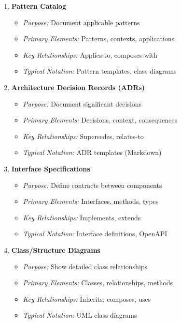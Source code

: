 \documentclass[11pt,letterpaper]{article}
\begin{document}
\begin{enumerate}[label=\textbf{MT\arabic*:}, leftmargin=2.5em]
    \item \textbf{Pattern Catalog}
    \begin{itemize}[nosep]
        \item \textit{Purpose:} Document applicable patterns
        \item \textit{Primary Elements:} Patterns, contexts, applications
        \item \textit{Key Relationships:} Applies-to, composes-with
        \item \textit{Typical Notation:} Pattern templates, class diagrams
    \end{itemize}
    
    \item \textbf{Architecture Decision Records (ADRs)}
    \begin{itemize}[nosep]
        \item \textit{Purpose:} Document significant decisions
        \item \textit{Primary Elements:} Decisions, context, consequences
        \item \textit{Key Relationships:} Supersedes, relates-to
        \item \textit{Typical Notation:} ADR templates (Markdown)
    \end{itemize}
    
    \item \textbf{Interface Specifications}
    \begin{itemize}[nosep]
        \item \textit{Purpose:} Define contracts between components
        \item \textit{Primary Elements:} Interfaces, methods, types
        \item \textit{Key Relationships:} Implements, extends
        \item \textit{Typical Notation:} Interface definitions, OpenAPI
    \end{itemize}
    
    \item \textbf{Class/Structure Diagrams}
    \begin{itemize}[nosep]
        \item \textit{Purpose:} Show detailed class relationships
        \item \textit{Primary Elements:} Classes, relationships, methods
        \item \textit{Key Relationships:} Inherits, composes, uses
        \item \textit{Typical Notation:} UML class diagrams
    \end{itemize}
    

\end{enumerate}
\end{document}
